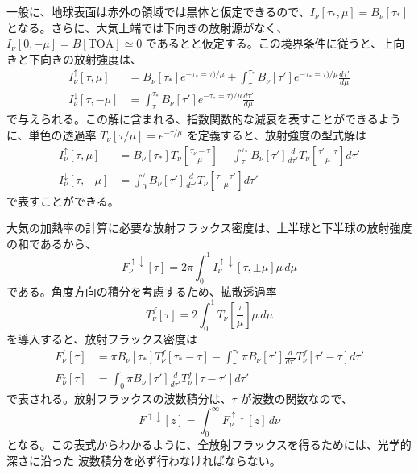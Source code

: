 \documentclass[book]{dennou777}
\begin{document}
一般に、地球表面は赤外の領域では黒体と仮定できるので、\(I_\nu[\tau_*,\mu]=B_\nu[\tau_*]\)
となる。さらに、大気上端では下向きの放射源がなく、 \(I_\nu[0,-\mu]=B[\mathrm{TOA}]\simeq0\)
であるとと仮定する。この境界条件に従うと、上向きと下向きの放射強度は、
\begin{align}
	I^\uparrow_\nu[\tau,\mu]
		&=B_\nu[\tau_*]e^{-\tau_*=\tau)/\mu}
		+\int^{\tau_*}_\tau B_\nu[\tau']e^{-\tau_*=\tau)/\mu}\frac{d\tau'}{d\mu}\\
		I^\downarrow_\nu[\tau,-\mu]
		&=\int^{\tau_*}_\tau B_\nu[\tau']e^{-\tau_*=\tau)/\mu}\frac{d\tau'}{d\mu}
\end{align}
で与えられる。この解に含まれる、指数関数的な減衰を表すことができるように、単色の透過率
\(T_\nu[\tau/\mu]=e^{-\tau/\mu}\) を定義すると、放射強度の型式解は
\begin{align}
	I^\uparrow_\nu[\tau,\mu]
		&=B_\nu[\tau_*]T_\nu\left[\frac{\tau_\nu-\tau}{\mu}\right]
		-\int^{\tau_*}_\tau B_\nu[\tau']\frac{d}{d\tau'}T_\nu\left[\frac{\tau'-\tau}{\mu}\right]d\tau'\\
		I^\downarrow_\nu[\tau,-\mu]
		&=\int^\tau_0 B_\nu[\tau']\frac{d}{d\tau'}T_\nu\left[\frac{\tau-\tau'}{\mu}\right]d\tau'
\end{align}
で表すことができる。

大気の加熱率の計算に必要な放射フラックス密度は、上半球と下半球の放射強度の和であるから、
\begin{equation}
	F^{\uparrow\downarrow}_\nu[\tau]=2\pi\int^1_0 I^{\uparrow\downarrow}_\nu[\tau,\pm\mu]\mu\,d\mu
\end{equation}
である。角度方向の積分を考慮するため、拡散透過率
\begin{equation}
	T^f_\nu[\tau]=2\int^1_0 T_\nu\left[\frac{\tau}{\mu}\right]\mu\,d\mu
\end{equation}
を導入すると、放射フラックス密度は
\begin{align}
	F^\uparrow_\nu[\tau]
		&=\pi B_\nu[\tau_*]T^f_\nu[\tau_*-\tau]
		-\int^{\tau_*}_\tau \pi B_\nu[\tau']\frac{d}{d\tau'}T^f_\nu[\tau'-\tau]d\tau'\\
		F^\downarrow_\nu[\tau]
		&=\int^\tau_0 \pi B_\nu[\tau']\frac{d}{d\tau'}T^f_\nu[\tau-\tau']d\tau'
\end{align}
で表される。放射フラックスの波数積分は、\(\tau\) が波数の関数なので、
\begin{equation}
	F^{\uparrow\downarrow}[z]=\int^\infty_0 F^{\uparrow\downarrow}_\nu[z]\,d\nu
\end{equation}
となる。この表式からわかるように、全放射フラックスを得るためには、光学的深さに沿った
波数積分を必ず行わなければならない。
\end{document}
